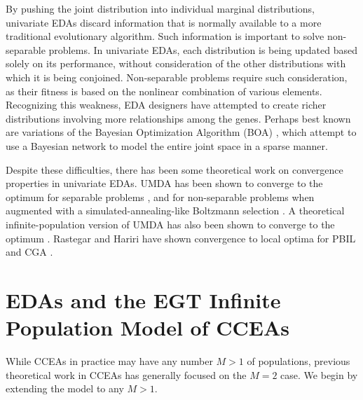 \documentclass{sig-alt-full}
\begin{document}
\vspace{0.5em}By pushing the joint distribution into individual marginal distributions, univariate EDAs discard information that is normally available to a more traditional evolutionary algorithm. Such information is important to solve non-separable problems.  In univariate EDAs, each distribution is being updated based solely on its performance, without consideration of the other distributions with which it is being conjoined.  Non-separable problems require such consideration, as their fitness is based on the nonlinear combination of various elements.  Recognizing this weakness, EDA designers have attempted to create richer distributions involving more relationships among the genes.  Perhaps best known are variations of the Bayesian Optimization Algorithm (BOA) \cite{pelikan99boa,hboa}, which attempt to use a Bayesian network to model the entire joint space in a sparse manner.

Despite these difficulties, there has been some theoretical work on convergence properties in univariate EDAs.  UMDA has been shown to converge to the optimum for separable problems \cite{MuehlenbeinManig1999JCIT}, and for non-separable problems when augmented with a simulated-annealing-like Boltzmann selection \cite{Muhlenbein99schemata,MuehlenbeinMahnig1999ECJ}.  A theoretical infinite-population version of UMDA has also been shown to converge to the optimum \cite{Zhang2004,ZhangMuehlenbein2004}.  Rastegar and Hariri have shown convergence to local optima for PBIL \cite{pbilconverge} and CGA \cite{cgaconverge}.

\section{EDAs and the EGT Infinite \\ Population Model of CCEAs}
\label{edacceamodel}

While CCEAs in practice may have any number \(M>1\) of populations, previous theoretical work in CCEAs has generally focused on the \(M=2\) case.  We begin by extending the model to any \(M>1\).
\end{document}
